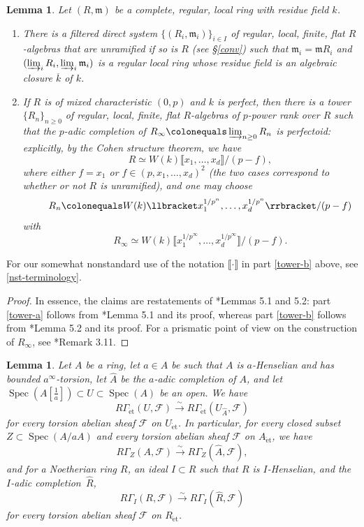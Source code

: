 \documentclass[11pt, reqno]{amsart}
\newcommand{\fm}{\mathfrak{m}}
\newcommand{\sF}{\mathscr{F}}
\DeclareMathOperator{\Spec}{Spec}		%
\newcommand{\ce}{\colonequals}
\newcommand{\et}{\mathrm{\acute{e}t}}	%
\newcommand{\isomto}{\overset{\sim}{\longrightarrow}}
\newcommand{\llb}{\llbracket}			%
\newcommand{\ov}{\overline}
\newcommand{\rrb}{\rrbracket}			%
\newcommand{\wh}{\widehat}
\providecommand{\up}[1]{{\upshape(}#1{\upshape)}}
\providecommand{\uref}[1]{{\upshape\ref{#1}}}
\providecommand{\uS}{{\upshape\S}}
\providecommand{\f}[2]{\frac{#1}{#2}}
\providecommand{\ucolon}{{\upshape:} }
\newcommand{\m}{\item}
\newcommand{\blem}{\begin{lemma}}
\newcommand{\elem}{\end{lemma}}
\newcommand{\benum}{\begin{enumerate}[label={{\upshape(\alph*)}}]}
\newcommand{\eenum}{\end{enumerate}}
\newcommand{\lab}{\label}
\newcommand{\qq}{\quad\quad}
\newcommand{\tst}{\textstyle}
\newcommand{\be}{\begin{equation}}
\newcommand{\bpf}{\begin{proof}}
\newcommand{\epf}{\end{proof}}
\numberwithin{equation}{numberingbase}
\theoremstyle{thms}
\newtheorem{lemma}[numberingbase]{Lemma}
\theoremstyle{claims}
\theoremstyle{defs}
\theoremstyle{thms}
\theoremstyle{defs}
\theoremstyle{subsection-tweak}
\theoremstyle{subsection-tweak}
\begin{document}
\blem \label{lem:towers}
Let $(R, \fm)$ be a complete, regular, local ring with residue field $k$.
\benum
\m \label{tower-a}
There is a filtered direct system $\{(R_i, \fm_i)\}_{i \in I}$ of regular, local, finite, flat $R$-algebras that are unramified if so is $R$ \up{see \uS\uref{conv}} such that $\fm_i = \fm R_i$ %
and $(\varinjlim_i R_i, \varinjlim_i \fm_i)$ is a regular local ring whose residue field is an algebraic closure $\ov{k}$ of $k$. 

\m \label{tower-b}
If $R$ is of mixed characteristic $(0, p)$ and $k$ is perfect, then there is a tower $\{R_n\}_{n \ge 0}$ of regular, local, finite, flat $R$-algebras of $p$-power rank over $R$ such that the $p$-adic completion of $R_\infty \ce \varinjlim_{n \ge 0} R_n$ is perfectoid\ucolon explicitly, by the Cohen structure theorem, we have
\[%
\qq R \simeq W(k)\llb x_1, \dotsc, x_d\rrb/(p - f), 
\]
where either $f = x_1$ or $f \in (p, x_1, \dotsc, x_d)^2$ \up{the two cases correspond to whether or not $R$ is unramified}, %
and one may choose
\[
\qq \tst R_n \ce W(k)\llb x_1^{1/p^n}, \dotsc, x_d^{1/p^n} \rrb/(p - f)
\]
with
\[
\tst \qq R_\infty \simeq W(k)\llb x_1^{1/p^\infty}, \dotsc, x_d^{1/p^\infty} \rrb/(p - f).
\]
\eenum
\elem

For our somewhat nonstandard use of the notation $\llb \cdot \rrb$ in part \ref{tower-b} above, see \eqref{nst-terminology}.



\bpf
In essence, the claims are restatements of \cite{brauer-purity}*{Lemmas 5.1 and 5.2}: part \ref{tower-a} follows from \cite{brauer-purity}*{Lemma 5.1} and its proof, whereas part \ref{tower-b} follows from \cite{brauer-purity}*{Lemma 5.2} and its proof. For a prismatic point of view on the construction of $R_\infty$, see \cite{BS19}*{Remark 3.11}.
\epf




\blem \label{lem:et-to-hat}
Let $A$ be a ring, let $a \in A$ be such that $A$ is $a$-Henselian and has bounded $a^\infty$-torsion, %
let $\wh{A}$ be the $a$-adic completion of $A$, and let $\Spec(A[\f 1a]) \subset U \subset \Spec(A)$ be an open. We have
\[
R\Gamma_\et(U, \sF) \isomto R\Gamma_\et(U_{\wh{A}}, \sF)
\]
for every torsion abelian sheaf $\sF$ on $U_\et$. In particular, for every closed subset $Z \subset \Spec(A/aA)$ and every torsion abelian sheaf $\sF$ on $A_\et$, we have
\[
R\Gamma_Z(A, \sF) \isomto R\Gamma_Z(\wh{A}, \sF),
\]
and for a Noetherian ring $R$, an ideal $I \subset R$ such that $R$ is  $I$-Henselian,  and the $I$-adic completion~$\wh{R}$,
\[
R\Gamma_I(R, \sF) \isomto R\Gamma_I(\wh{R}, \sF) 
\]
for every torsion abelian sheaf $\sF$ on $R_\et$.
\elem
\end{document}
